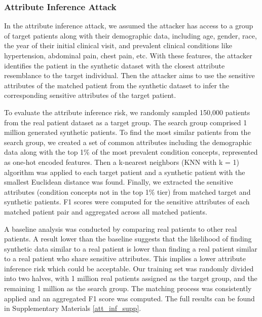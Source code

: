 \begin{multicols}{2}
\subsubsection{Attribute Inference Attack}
In the attribute inference attack, we assumed the attacker has access to a group of target patients along with their demographic data, including age, gender, race, the year of their initial clinical visit, and prevalent clinical conditions like hypertension, abdominal pain, chest pain, etc. With these features, the attacker identifies the patient in the synthetic dataset with the closest attribute resemblance to the target individual. Then the attacker aims to use the sensitive attributes of the matched patient from the synthetic dataset to infer the corresponding sensitive attributes of the target patient.

To evaluate the attribute inference risk, we randomly sampled 150,000 patients from the real patient dataset as a target group. The search group comprised 1 million generated synthetic patients. To find the most similar patients from the search group, we created a set of common attributes including the demographic data along with the top 1\% of the most prevalent condition concepts, represented as one-hot encoded features. Then a k-nearest neighbors (KNN with k = 1) algorithm was applied to each target patient and a synthetic patient with the smallest Euclidean distance was found. Finally, we extracted the sensitive attributes (condition concepts not in the top 1\% tier) from matched target and synthetic patients. F1 scores were computed for the sensitive attributes of each matched patient pair and aggregated across all matched patients.

A baseline analysis was conducted by comparing real patients to other real patients. A result lower than the baseline suggests that the likelihood of finding synthetic data similar to a real patient is lower than finding a real patient similar to a real patient who share sensitive attributes. This implies a lower attribute inference risk which could be acceptable. Our training set was randomly divided into two halves, with 1 million real patients assigned as the target group, and the remaining 1 million as the search group. The matching process was consistently applied and an aggregated F1 score was computed. The full results can be found in Supplementary Materials \ref{att_inf_supp}.


\end{multicols}
